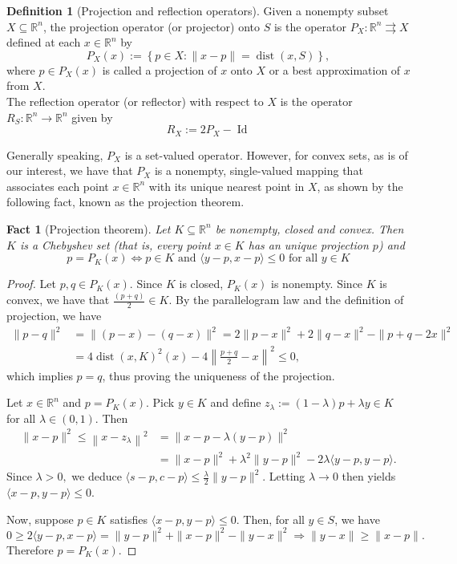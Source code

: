 \documentclass[smallextended,numbook,nospthms]{svjour3}
\theoremstyle{plain}
\newtheorem{fact}[theorem]{Fact}
\theoremstyle{definition}
\newtheorem{definition}[theorem]{Definition}
\def\RR{\mathds R}
\DeclareMathOperator{\dist}{dist}
\begin{document}
\begin{definition}[Projection and reflection operators]{\label{def:proj}}
	Given a nonempty subset $X \subseteq \RR^n$, the projection operator (or projector) onto $S$ is the operator $P_{X}: \RR^n \rightrightarrows X$ defined at each $x \in \RR^n$ by
	\[
	P_{X}(x):=\left\{p \in X:\|x-p\|=\dist(x,S)\right\},
	\]
	where $p \in P_{X}(x)$ is called a projection of $x$ onto $X$ or a best approximation of $x$ from $X$.\\
	The reflection operator (or reflector) with respect to $X$ is the operator $R_{S}: \RR^n \rightarrow \RR^n$ given by
	\[
	R_{X}:=2P_{X}-\operatorname{Id}
	\]
\end{definition}

Generally speaking, $P_{X}$ is a set-valued operator.
However, for convex sets, as is of our interest, we have that $P_{X}$ is a nonempty, single-valued mapping that associates each point $x \in \RR^n$ with its unique nearest point in $X$, as shown by the following fact, known as the projection theorem.

\begin{fact}[Projection theorem]\label{fact:proj thm}
	Let $K \subseteq \RR^{n}$ be nonempty, closed and convex. Then $K$ is a Chebyshev set (that is, every point $x \in K$ has an unique projection $p$) and
	\begin{equation}
		p=P_{K}(x) \iff p \in K \text { and }\langle y-p, x-p\rangle \leq 0 \text { for all } y \in K
	\end{equation}
\end{fact}
\begin{proof}
	Let $p, q \in P_{K}(x)$. Since $K$ is closed, $P_{K}(x)$ is nonempty. Since $K$ is convex, we have that $\frac{(p+q)}{2} \in K$. By the parallelogram law and the definition of projection, we have
	\[
	\begin{aligned}
		\|p-q\|^{2} &=\|(p-x)-(q-x)\|^{2} = 2\|p-x\|^{2}+2\|q-x\|^{2}-\|p+q-2 x\|^{2} \\
		&=4 \dist(x,K)^{2}(x)-4\left\|\frac{p+q}{2}-x\right\|^{2} \leq 0,
	\end{aligned}
	\]
	which implies $p=q$, thus proving the uniqueness of the projection. 
	
	Let $x \in \RR^n$ and $p=P_{K}(x)$. Pick $y \in K$ and define $z_{\lambda}:=(1-\lambda) p+\lambda y \in K$ for all $\lambda \in (0,1)$. Then
	\begin{align}
		\|x-p\|^{2} \leq\left\|x-z_{\lambda}\right\|^{2} &=\|x-p-\lambda(y-p)\|^{2} \\
		&=\|x-p\|^{2}+\lambda^{2}\|y-p\|^{2}-2 \lambda\langle y-p, y-p\rangle.
	\end{align}
	Since $\lambda>0,$ we deduce $\langle s-p, c-p\rangle \leq \frac{\lambda}{2}\|y-p\|^{2}$. Letting $\lambda \rightarrow 0$ then yields $\langle x-p, y-p\rangle \leq 0$.
	
	Now, suppose $p \in K$ satisfies
	$\langle x-p, y-p\rangle \leq 0$. Then, for all $y \in S$, we have
	\[
	0 \geq 2\langle y-p, x-p\rangle=\|y-p\|^{2}+\|x-p\|^{2}-\|y-x\|^{2} \Longrightarrow\|y-x\| \geq\|x-p\|.
	\]
	Therefore $p=P_{K}(x)$.
\end{proof}
\end{document}
